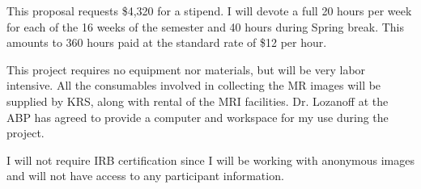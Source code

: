 \documentclass[ letterpaper, 12 pt, conference]{ieeeconf}  %
\begin{document}
This proposal requests \$4,320 for a stipend. I will devote a full 20 hours per week for each of the 16 weeks of the semester and 40 hours during Spring break.  This amounts to 360 hours paid at the standard rate of \$12 per hour.

This project requires no equipment nor materials, but will be very labor intensive.  All the consumables involved in collecting the MR images will be supplied by \ac{KRS}, along with rental of the MRI facilities.   Dr. Lozanoff at the \ac{ABP} has agreed to provide a computer and workspace for my use during the project.

I will not require IRB certification since I will be working with anonymous images and will not have access to any participant information.

{}

\end{document}

